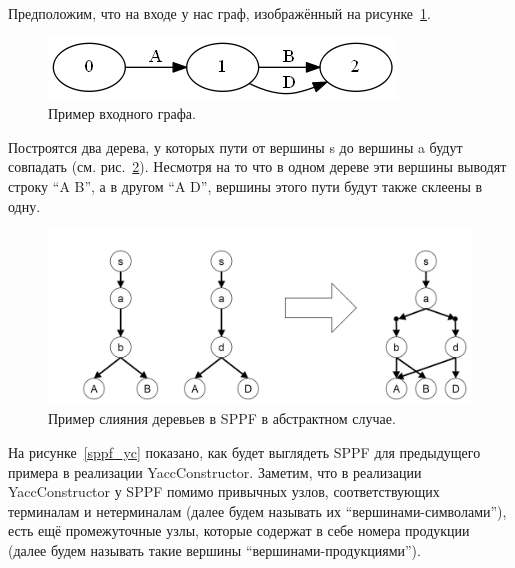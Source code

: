 Предположим, что на входе у нас граф, изображённый на рисунке~\ref{sppf_input}.

\begin{figure}[t]
\centering
\includegraphics[width=0.5\linewidth]{Ivanov/Pictures/SPPF_input.png}
\caption{Пример входного графа.}
\label{sppf_input}
\end{figure}

Построятся два дерева, у которых пути от вершины s до вершины a будут совпадать (см. рис.~\ref{sppf2}). Несмотря на то что в одном дереве эти вершины выводят строку ``A B'', а в другом ``A D'', вершины этого пути будут также склеены в одну. 

\begin{figure}[t]
\centering
\includegraphics[width=\linewidth]{Ivanov/Pictures/sppf2.png}
\caption{Пример слияния деревьев в SPPF в абстрактном случае.}
\label{sppf2}
\end{figure}

На рисунке~\ref{sppf_yc} показано, как будет выглядеть SPPF для предыдущего примера в реализации YaccConstructor. Заметим, что в реализации YaccConstructor у SPPF помимо привычных узлов, соответствующих терминалам и нетерминалам (далее будем называть их ``вершинами-символами''), есть ещё промежуточные узлы, которые содержат в себе номера продукции (далее будем называть такие вершины ``вершинами-продукциями''). 

